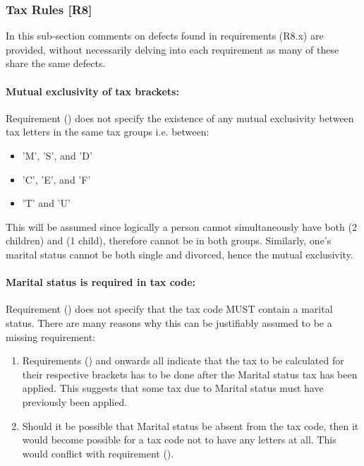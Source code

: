 \subsubsection{Tax Rules [R8]}

In this sub-section comments on defects found in requirements (R8.x) are provided, without necessarily delving into each requirement as many of these share the same defects.

\paragraph{Mutual exclusivity of tax brackets:}
Requirement (\REightFour) does not specify the existence of any mutual exclusivity between tax letters in the same tax groups i.e. between: 
\begin{itemize}[noitemsep]
\item 'M', 'S', and 'D' 
\item 'C', 'E', and 'F'
\item 'T' and 'U'
\end{itemize}
This will be assumed since logically a person cannot simultaneously have both (2 children) and (1 child), therefore cannot be in both groups. Similarly, one's marital status cannot be both single and divorced, hence the mutual exclusivity.  

\paragraph{Marital status is required in tax code:}
Requirement (\REightFour) does not specify that the tax code MUST contain a marital status. There are many reasons why this can be justifiably assumed to be a missing requirement: 
\begin{enumerate}
	\item Requirements (\REightEight) and onwards all indicate that the tax to be calculated for their respective brackets has to be done after the Marital status tax has been applied. This suggests that some tax due to Marital status must have previously been applied. 
	\item Should it be possible that Marital status be absent from the tax code, then it would become possible for a tax code not to have any letters at all. This would conflict with requirement (\REightTwo). %
\end{enumerate}

